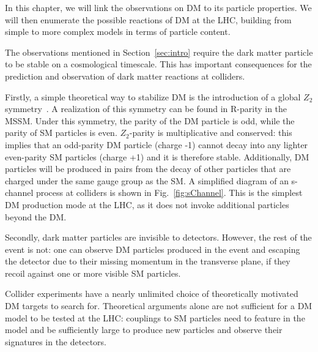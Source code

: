 \begin{marginnote}[]
In this chapter, we will link the observations on DM to its particle properties. We will then enumerate the possible reactions of DM at the LHC, building from simple to more complex models in terms of particle content.  
\end{marginnote}

The observations mentioned in Section~\ref{sec:intro} require the dark matter particle to be stable on a cosmological timescale. This has important consequences for the prediction and observation of dark matter reactions at colliders. 

Firstly, a simple theoretical way to stabilize DM is the introduction
of a global $Z_2$ symmetry~\cite{Batell:2010bp}. A realization of this
symmetry can be found in R-parity in the MSSM. %
Under this symmetry, the parity of the DM particle is odd, while the parity of SM particles is even. 
$Z_2$-parity is multiplicative and conserved: this 
implies that an odd-parity DM particle (charge -1) cannot decay into any 
lighter even-parity SM particles (charge +1) and it is therefore stable. 
Additionally, DM particles will be produced in pairs from the decay of other particles
that are charged under the same gauge group as the SM. A simplified diagram of an 
s-channel process at colliders is shown in Fig.~\ref{fig:sChannel}. This is the simplest 
DM production mode at the LHC, as it does not invoke additional particles beyond the DM. 

Secondly, dark matter particles are invisible to detectors. 
However, the rest of the event is not: one can observe DM particles
produced in the event and escaping the detector 
due to their missing momentum in the transverse plane, if they recoil against one or 
more visible SM particles. 



Collider experiments have a nearly unlimited choice of theoretically
motivated DM targets to search for. 
Theoretical arguments alone are not sufficient for a DM model to be tested at the LHC: 
couplings to SM particles need to feature in the model and be sufficiently large
to produce new particles and observe their signatures in the detectors. 

